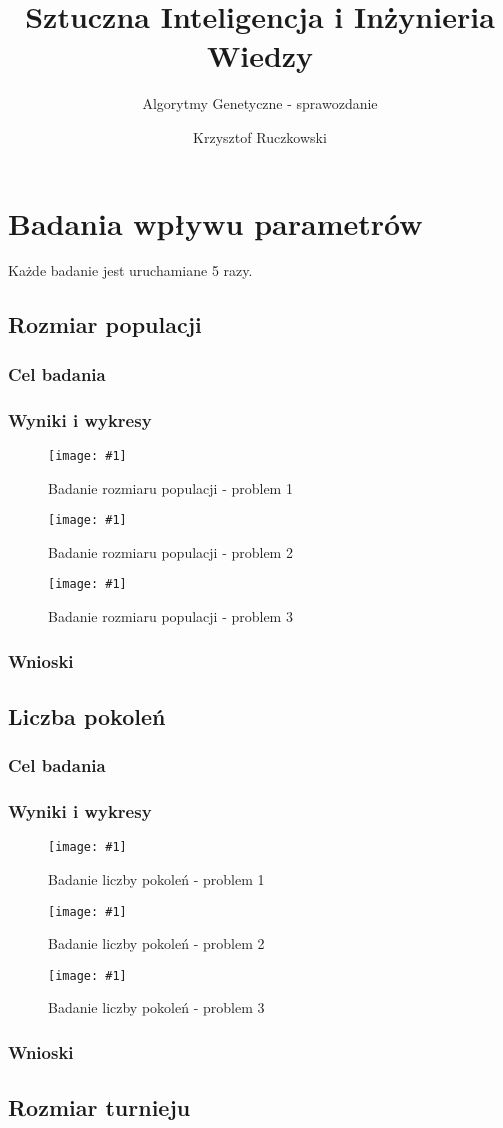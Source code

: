 \documentclass[12pt,a4paper]{article}
\author{Krzysztof Ruczkowski}
\title{Sztuczna Inteligencja i Inżynieria Wiedzy}
\subtitle{Algorytmy Genetyczne - sprawozdanie}
\newcommand{\image}[2] {
    \begin{figure}[H]
        \begin{center}
            \texttt{[image: \#1]}
        \end{center}
        \caption{#2}
        \label{#1}
    \end{figure}
}
\begin{document}
\maketitle
\tableofcontents
\newpage

\section{Badania wpływu parametrów}
Każde badanie jest uruchamiane 5 razy.
\subsection{Rozmiar populacji}
\subsubsection{Cel badania}
\subsubsection{Wyniki i wykresy}
\image{images/Badanie rozmiaru populacji_1}{Badanie rozmiaru populacji - problem 1}
\image{images/Badanie rozmiaru populacji_2}{Badanie rozmiaru populacji - problem 2}
\image{images/Badanie rozmiaru populacji_3}{Badanie rozmiaru populacji - problem 3}
\subsubsection{Wnioski}
\subsection{Liczba pokoleń}
\subsubsection{Cel badania}
\subsubsection{Wyniki i wykresy}
\image{images/Badanie liczby generacji_1}{Badanie liczby pokoleń - problem 1}
\image{images/Badanie liczby generacji_2}{Badanie liczby pokoleń - problem 2}
\image{images/Badanie liczby generacji_3}{Badanie liczby pokoleń - problem 3}
\subsubsection{Wnioski}
\subsection{Rozmiar turnieju}
\end{document}
